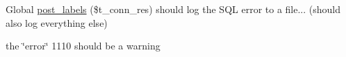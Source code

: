 
\begin{DoxyRefList}
\item[Global \mbox{\hyperlink{planlabels_8php_a63da149e1c19489a63a10defc5a47ef7}{post\+\_\+labels}} (\$t\+\_\+conn\+\_\+res)]\label{todo__todo000002}%
%
should log the S\+QL error to a file... (should also log everything else) 

the \char`\"{}error\char`\"{} 1110 should be a warning 
\end{DoxyRefList}